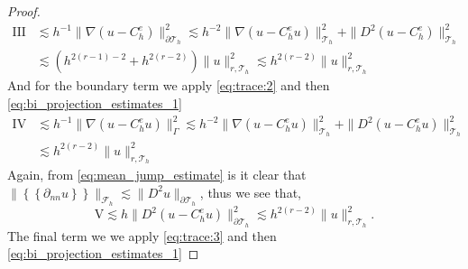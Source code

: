 \documentclass[11pt]{article}
\theoremstyle{remark}
\newcommand{\mean}[1]{\left\{\!\!\left\{#1\right\}\!\!\right\}}
\numberwithin{equation}{section}
\begin{document}
\begin{proof}
\begin{equation}
\begin{split}
            \mathrm{III}  & \lesssim h^{-1} \|  \nabla ( u - C_{h}^{e})  \|_{\partial \mathcal{T}_{h}   }^{2  }  \lesssim h^{-2} \| \nabla ( u - C^{e}_{h}u)  \|_{ \mathcal{T} _{h}
                          }^{ 2 } + \|  D^2  ( u - C_{h}^{e})  \|_{\mathcal{T}_{h}   }^{ 2 } \\
                          & \lesssim  ( h ^{2( r-1) -2 } + h^{2( r-2) } ) \| u  \|_{r, \mathcal{T}_{h}   }^{2  }  \lesssim  h^{2( r-2) }  \| u  \|_{r, \mathcal{T}_{h}   }^{ 2 }
    \end{split}
\end{equation}
And for the boundary term we apply \eqref{eq:trace:2} and then \eqref{eq:bi_projection_estimates_1}
        \begin{equation}
            \begin{split}
            \mathrm{IV}   & \lesssim h^{-1} \|  \nabla  ( u - C_{h}^{e}u ) \|_{ \Gamma  }^{2  }    \lesssim h^{-2} \| \nabla ( u - C_{h}^{e}u )  \|_{ \mathcal{T}_{h}   }^{2  } + \| D^2( u - C_{h}^{e}u ) \|_{ \mathcal{T}_{h}   }^{ 2 } \\   & \lesssim  h^{2( r-2) }  \| u  \|_{r, \mathcal{T}_{h}   }^{ 2 }
            \end{split}
        \end{equation}
Again, from \eqref{eq:mean_jump_estimate} is it clear that $\| \mean{ \partial _{nn} u }   \|_{ \mathcal{F}_{h}   }^{  } \lesssim \| D^2  u \|_{ \partial  \mathcal{T} _{h} }^{  }   $, thus we see that,
        \begin{equation}
            \mathrm{V}   \lesssim h \|  D^2  ( u - C_{h}^{e}u ) \|_{\partial \mathcal{T}_{h}}^{2  }  \lesssim  h^{2( r - 2 )} \| u \|_{r, \mathcal{T}_{h}   }^{ 2 }.
        \end{equation}
        The final term we we apply \eqref{eq:trace:3} and then \eqref{eq:bi_projection_estimates_1}


\end{proof}
\end{document}
